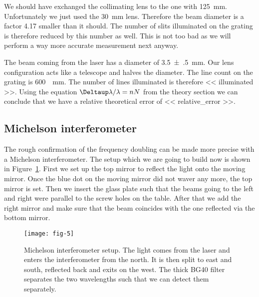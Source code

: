 \documentclass[11pt, english, fleqn, DIV=15, headinclude, BCOR=2cm]{scrreprt}
\begin{document}
We should have exchanged the collimating lens to the one with
\SI{125}{\milli\meter}. Unfortunately we just used the \SI{30}{\milli\meter}
lens. Therefore the beam diameter is a factor \num{4.17} smaller than it
should. The number of slits illuminated on the grating is therefore reduced by
this number as well. This is not too bad as we will perform a way more accurate
measurement next anyway.


The beam coming from the laser has a diameter of \SI{3.5(5)}{\milli\meter}.
Our lens configuration acts like a telescope and halves the diameter. The
line count on the grating is \SI{600}{\per\milli\meter}. The number of lines
illuminated is therefore \num{<< illuminated >>}. Using the equation $\Deltaup
\lambda / \lambda = nN$ from the theory section we can conclude that we have a
relative theoretical error of \num{<< relative_error >>}.


\subsection{Michelson interferometer}

The rough confirmation of the frequency doubling can be made more precise with
a Michelson interferometer. The setup which we are going to build now is shown
in Figure~\ref{fig:fig-5}. First we set up the top mirror to reflect the light
onto the moving mirror. Once the blue dot on the moving mirror did not waver
any more, the top mirror is set. Then we insert the glass plate such that
the beams going to the left and right were parallel to the screw holes on the
table. After that we add the right mirror and make sure that the beam coincides
with the one reflected via the bottom mirror.

\begin{figure}
    \centering
    \texttt{[image: fig-5]}
    \caption{%
        Michelson interferometer setup. The light comes from the laser and
        enters the interferometer from the north. It is then split to east and
        south, reflected back and exits on the west. The thick BG40 filter
        separates the two wavelengths such that we can detect them separately.
        \parencite[Figure~5]{lab-course/doubling/manual}
    }
    \label{fig:fig-5}
\end{figure}
\end{document}
